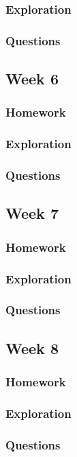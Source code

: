 \documentclass{article}
\theoremstyle{theorem}
\theoremstyle{definition}
\theoremstyle{remark}
\begin{document}
\subsubsection{Exploration}
\subsubsection{Questions}

\subsection{Week 6}
\subsubsection{Homework}
\subsubsection{Exploration}
\subsubsection{Questions}

\subsection{Week 7}
\subsubsection{Homework}
\subsubsection{Exploration}
\subsubsection{Questions}

\subsection{Week 8}
\subsubsection{Homework}
\subsubsection{Exploration}
\subsubsection{Questions}
\end{document}
